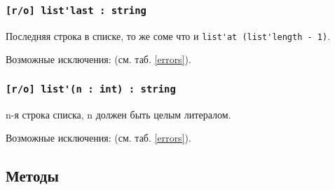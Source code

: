 \subsubsection{\lstinline|[r/o] list'last : string|}

Последняя строка в списке, то же соме что и \lstinline|list'at (list'length - 1)|.

Возможные исключения:  (см. таб. \ref{errors}).

\subsubsection{\lstinline|[r/o] list'(n : int) : string|}

n-я строка списка, n должен быть целым литералом.

Возможные исключения:  (см. таб. \ref{errors}).

\subsection{Методы}


